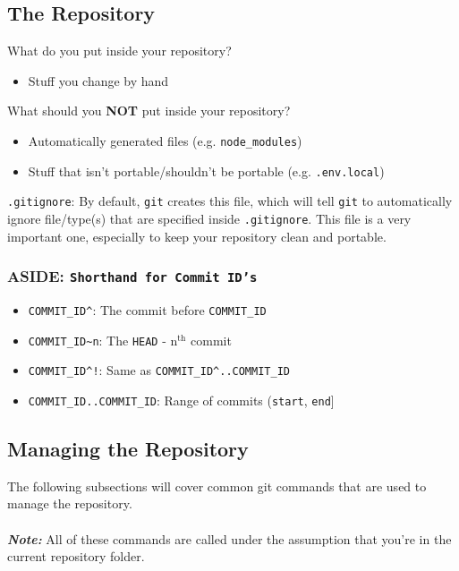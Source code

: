 \documentclass[13pt]{article}
\begin{document}
\subsection{The Repository}
What do you put inside your repository?
\begin{itemize}[label=,leftmargin=*]
\item Stuff you change by hand
\end{itemize}
What should you \textbf{NOT} put inside your repository?
\begin{itemize}[label=,leftmargin=*]
\item Automatically generated files (e.g. \texttt{node\_modules})
\item Stuff that isn't portable/shouldn't be portable (e.g. \texttt{.env.local})
\end{itemize}
\texttt{.gitignore}: By default, \texttt{git} creates this file, which will tell \texttt{git} to automatically ignore file/type(s) that are specified inside \texttt{.gitignore}. This file is a very important one, especially to keep your repository clean and portable.

\subsubsection*{ASIDE: \texttt{Shorthand for Commit ID's}}
\begin{itemize}[label=,leftmargin=*]
\item \texttt{COMMIT\_ID\^}: The commit before \texttt{COMMIT\_ID}
\item \texttt{COMMIT\_ID\textasciitilde n}: The \texttt{HEAD} - n$^\text{th}$ commit
\item \texttt{COMMIT\_ID\^}\texttt{!}: Same as \texttt{COMMIT\_ID\^}\texttt{..COMMIT\_ID}
\item \texttt{COMMIT\_ID..COMMIT\_ID}: Range of commits (\texttt{start}, \texttt{end}]
\end{itemize}





\subsection{Managing the Repository}
The following subsections will cover common git commands that are used to manage the repository. \\ \\
\textbf{\textit{Note:}} All of these commands are called under the assumption that you're in the current repository folder.
\end{document}
